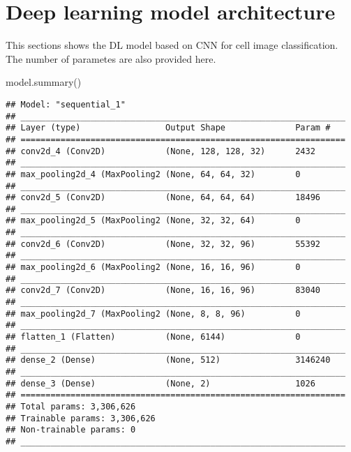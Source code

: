 \documentclass[]{book}
\newenvironment{Shaded}{\begin{snugshade}}{\end{snugshade}}
\newcommand{\NormalTok}[1]{#1}
\begin{document}
\hypertarget{deep-learning-model-architecture}{%
\section{Deep learning model architecture}\label{deep-learning-model-architecture}}

This sections shows the DL model based on CNN for cell image classification. The number of parametes are also provided here.

\begin{Shaded}
\begin{Highlighting}[]
\NormalTok{model.summary()}
\end{Highlighting}
\end{Shaded}

\begin{verbatim}
## Model: "sequential_1"
## _________________________________________________________________
## Layer (type)                 Output Shape              Param #   
## =================================================================
## conv2d_4 (Conv2D)            (None, 128, 128, 32)      2432      
## _________________________________________________________________
## max_pooling2d_4 (MaxPooling2 (None, 64, 64, 32)        0         
## _________________________________________________________________
## conv2d_5 (Conv2D)            (None, 64, 64, 64)        18496     
## _________________________________________________________________
## max_pooling2d_5 (MaxPooling2 (None, 32, 32, 64)        0         
## _________________________________________________________________
## conv2d_6 (Conv2D)            (None, 32, 32, 96)        55392     
## _________________________________________________________________
## max_pooling2d_6 (MaxPooling2 (None, 16, 16, 96)        0         
## _________________________________________________________________
## conv2d_7 (Conv2D)            (None, 16, 16, 96)        83040     
## _________________________________________________________________
## max_pooling2d_7 (MaxPooling2 (None, 8, 8, 96)          0         
## _________________________________________________________________
## flatten_1 (Flatten)          (None, 6144)              0         
## _________________________________________________________________
## dense_2 (Dense)              (None, 512)               3146240   
## _________________________________________________________________
## dense_3 (Dense)              (None, 2)                 1026      
## =================================================================
## Total params: 3,306,626
## Trainable params: 3,306,626
## Non-trainable params: 0
## _________________________________________________________________
\end{verbatim}
\end{document}
